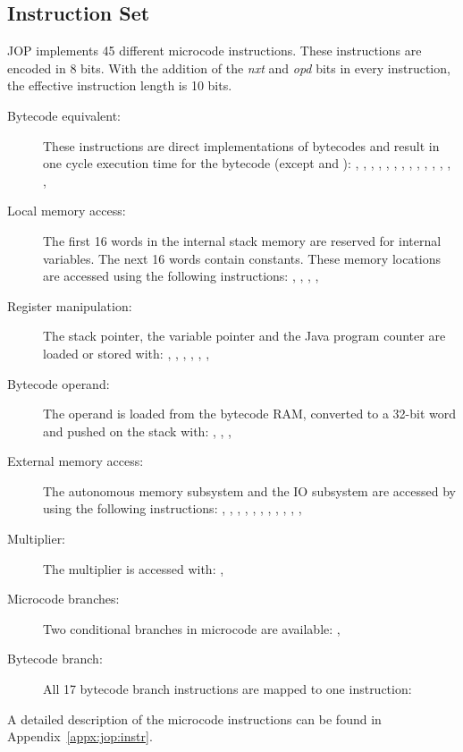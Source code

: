 \subsection{Instruction Set}

JOP implements 45 different microcode instructions. These
instructions are encoded in 8 bits. With the addition of the
\emph{nxt} and \emph{opd} bits in every instruction, the effective
instruction length is 10 bits.

\begin{description}
    \item[Bytecode equivalent:]
These instructions are direct implementations of bytecodes and
result in one cycle execution time for the bytecode (except
 and ): , , ,
, , , , ,
, , , , ,
, 

    \item[Local memory access:]
The first 16 words in the internal stack memory are reserved for
internal variables. The next 16 words contain constants. These
memory locations are accessed using the following instructions:
, , , , 

    \item[Register manipulation:]
The stack pointer, the variable pointer and the Java program counter
are loaded or stored with: , , ,
, , , 

    \item[Bytecode operand:]
The operand is loaded from the bytecode RAM, converted to a 32-bit
word and pushed on the stack with: ,
, , 

    \item[External memory access:]
The autonomous memory subsystem and the IO subsystem are accessed by
using the following instructions: , ,
, , , ,
, , , ,
, 

    \item[Multiplier:]
The multiplier is accessed with: , 

    \item[Microcode branches:]
Two conditional branches in microcode are available: ,

    \item[Bytecode branch:]
All 17 bytecode branch instructions are mapped to one instruction:

\end{description}
%
A detailed description of the microcode instructions can be found in
Appendix~\ref{appx:jop:instr}.

